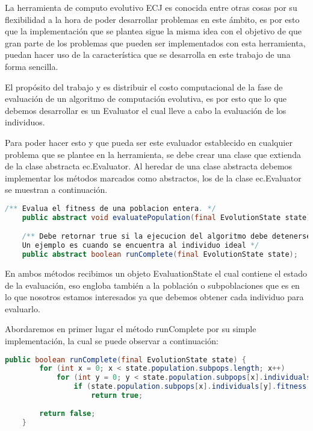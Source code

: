 La herramienta de computo evolutivo ECJ es conocida entre otras cosas por su flexibilidad a la hora de poder desarrollar problemas en este ámbito, es por esto que la implementación que se plantea sigue la misma idea con el objetivo de que gran parte de los problemas que pueden ser implementados con esta herramienta, puedan hacer uso de la característica que se desarrolla en este trabajo de una forma sencilla.

El propósito del trabajo y es distribuir el costo computacional de la fase de evaluación de un algoritmo de computación evolutiva, es por esto que lo que debemos desarrollar es un Evaluator  el cual lleve a cabo la evaluación de los individuos.

Para poder hacer esto y que pueda ser este evaluador establecido en cualquier problema que se plantee en la herramienta, se debe crear una clase que extienda de la clase abstracta ec.Evaluator. Al heredar de una clase abstracta debemos implementar los métodos marcados como abstractos, los de la clase ec.Evaluator se muestran a continuación.

\begin{lstlisting}[language=Java]
    /** Evalua el fitness de una poblacion entera. */
    public abstract void evaluatePopulation(final EvolutionState state);

    /** Debe retornar true si la ejecucion del algoritmo debe detenerse por algun motivo.
    Un ejemplo es cuando se encuentra al individuo ideal */
    public abstract boolean runComplete(final EvolutionState state);
\end{lstlisting}

En ambos métodos recibimos un objeto EvaluationState el cual contiene el estado de la evaluación, eso engloba también a la población o subpoblaciones que es en lo que nosotros estamos interesados ya que debemos obtener cada individuo para evaluarlo.

Abordaremos en primer lugar el método runComplete por su simple implementación, la cual se puede observar a continuación:

\begin{lstlisting}[language=Java]
	public boolean runComplete(final EvolutionState state) {
		for (int x = 0; x < state.population.subpops.length; x++)
			for (int y = 0; y < state.population.subpops[x].individuals.length; y++)
				if (state.population.subpops[x].individuals[y].fitness.isIdealFitness())
					return true;
		
		return false;
	}
\end{lstlisting}

